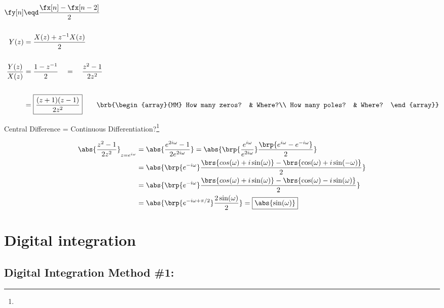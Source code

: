 \begin{align*}
  \fy[n]
    &\eqd \frac{\fx[n] - \fx[n-2]}{2}
  \\\\
  Y(z) &= \frac{X(z) + z^{-1}X(z)}{2}
  \\\\
  \frac{Y(z)}{X(z)} &= \frac{1-z^{-1}}{2} \quad=\quad {\frac{z^2-1}{2z^2}}
  \\\\
                    &= \boxed{\frac{(z+1)(z-1)}{2z^2}} 
  \qquad\brb{\begin{array}{MM}
    How many zeros? & Where?\\
    How many poles? & Where?
  \end{array}}
\end{align*}


Central Difference = Continuous Differentiation?\footnote{}
 
\begin{align*}
  \abs{\frac{z^2-1}{2z^2}}_{z=e^{i\omega}}
    &= \abs{\frac{e^{2i\omega}-1}
                 {2e^{2i\omega}}
           }
     = \abs{\brp{\frac{e^{i\omega}}{e^{2i\omega}}}
            \frac{\brp{e^{i\omega}-e^{-i\omega}}}{2}
           }
  \\&= \abs{\brp{e^{-i\omega}}
            \frac{\brs{cos(\omega)+i\sin(\omega)}-\brs{\cos(\omega)+i\sin(-\omega)}}{2}
           }
  \\&= \abs{\brp{e^{-i\omega}}
            \frac{\brs{cos(\omega)+i\sin(\omega)}-\brs{\cos(\omega)-i\sin(\omega)}}{2}
           }
  \\&= \abs{\brp{e^{-i\omega+\pi/2}}
            \frac{2\sin(\omega)}{2}
           }
     = \boxed{\abs{\sin(\omega)}}
\end{align*}


\section{Digital integration}
\subsection{Digital Integration Method \#1: }


